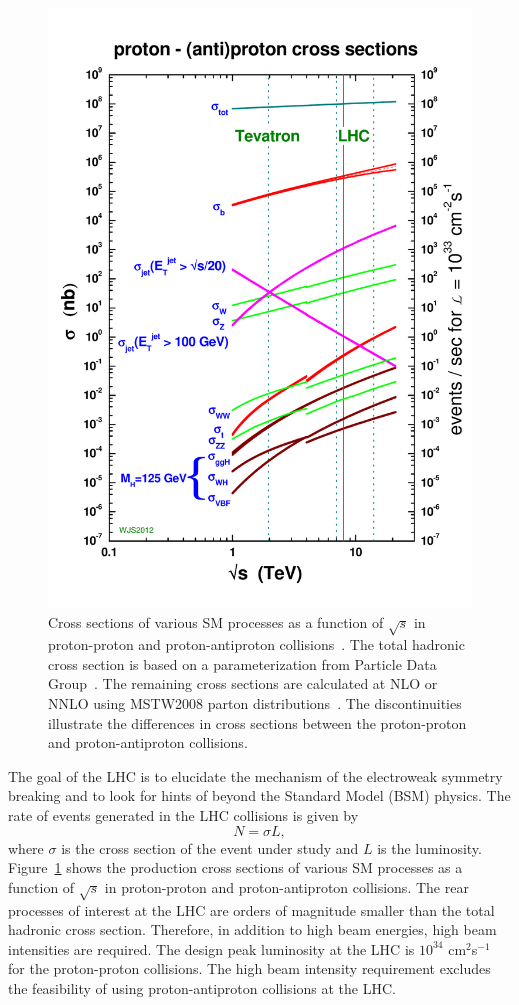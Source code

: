 \begin{figure}[h]
\centering
\includegraphics[width=0.5\columnwidth]{figures_chapter2/crosssections2013}
\caption{Cross sections of various SM processes as a function of $\sqrt{s}$ in proton-proton and proton-antiproton collisions~\cite{sterling}. The total hadronic cross section is based on a parameterization from Particle Data Group~\cite{Agashe:2014kda}. The remaining cross sections are calculated at NLO or NNLO using MSTW2008 parton distributions~\cite{MSTW}. The discontinuities illustrate the differences in cross sections between the proton-proton and proton-antiproton collisions.}
\label{fig:xsec}
\end{figure}

The goal of the LHC is to elucidate the mechanism of the electroweak symmetry breaking and to look for hints of beyond the Standard Model (BSM) physics. The rate of events generated in the LHC collisions is given by 
\begin{equation} \label{eq:lumi}
N = \sigma L,
\end{equation}
where $\sigma$ is the cross section of the event under study and $L$ is the luminosity. Figure~\ref{fig:xsec} shows the production cross sections of various SM processes as a function of $\sqrt{s}$ in proton-proton and proton-antiproton collisions. The rear processes of interest at the LHC are orders of magnitude smaller than the total hadronic cross section. Therefore, in addition to high beam energies, high beam intensities are required. The design peak luminosity at the LHC is $10^{34}$ cm$^2$s$^{-1}$ for the proton-proton collisions. The high beam intensity requirement excludes the feasibility of using proton-antiproton collisions at the LHC. 

